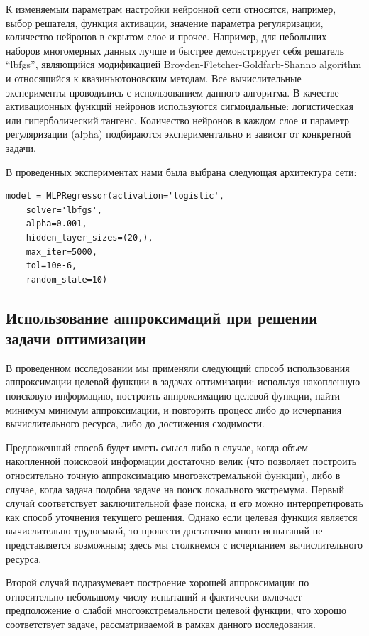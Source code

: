 \documentclass[sensors,article,submit,moreauthors,pdftex]{Definitions/mdpi}
\begin{document}
К изменяемым параметрам настройки нейронной сети относятся, например, выбор решателя, функция активации, значение параметра регуляризации, количество нейронов в скрытом слое и прочее.
Например, для небольших наборов многомерных данных лучше и быстрее демонстрирует себя решатель ``lbfgs'', являющийся модификацией Broyden-Fletcher-Goldfarb-Shanno algorithm \cite{Nocedal2006} и относящийся к квазиньютоновским методам. Все вычислительные эксперименты проводились с использованием данного алгоритма.
В качестве активационных функций нейронов используются сигмоидальные: логистическая или гиперболический тангенс. 
Количество нейронов в каждом слое и параметр регуляризации (alpha) подбираются экспериментально и зависят от конкретной задачи. 

В проведенных экспериментах нами была выбрана следующая архитектура сети: 
\begin{verbatim}
model = MLPRegressor(activation='logistic',
	solver='lbfgs',
	alpha=0.001,
	hidden_layer_sizes=(20,),
	max_iter=5000,
	tol=10e-6,
	random_state=10)
\end{verbatim}


\subsection{Использование аппроксимаций при решении задачи оптимизации}

В проведенном исследовании мы применяли следующий способ использования аппроксимации целевой функции в задачах оптимизации: используя накопленную поисковую информацию, построить аппроксимацию целевой функции, найти минимум минимум аппроксимации, и повторить процесс либо до исчерпания вычислительного ресурса, либо до достижения сходимости.

Предложенный способ будет иметь смысл либо в случае, когда объем накопленной поисковой информации достаточно велик (что позволяет построить относительно точную аппроксимацию многоэкстремальной функции), либо в случае, когда задача подобна задаче на поиск локального экстремума. 
Первый случай соответствует заключительной фазе поиска, и его можно интерпретировать как способ уточнения текущего решения. Однако если целевая функция является вычислительно-трудоемкой, то провести достаточно много испытаний не представляется возможным; здесь мы столкнемся с исчерпанием вычислительного ресурса.

Второй случай подразумевает построение хорошей аппроксимации по относительно небольшому числу испытаний и фактически включает предположение о слабой многоэкстремальности целевой функции, что хорошо соответствует задаче, рассматриваемой в рамках данного исследования.
\end{document}
